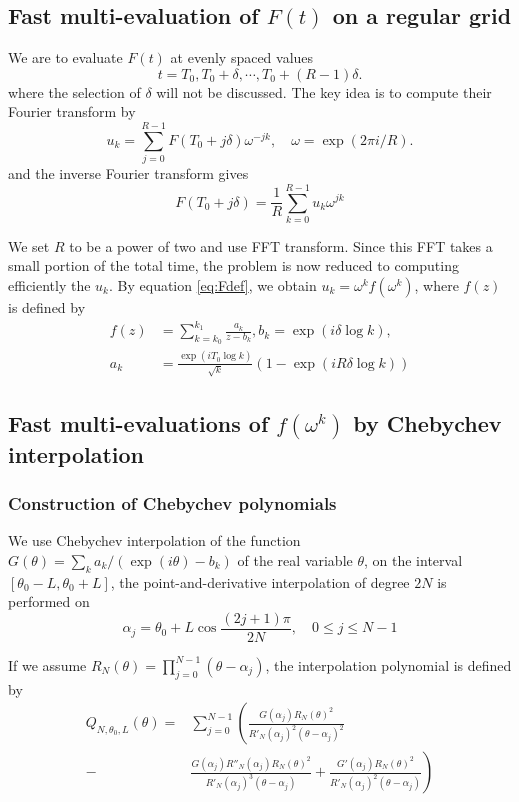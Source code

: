 \documentclass[conference,9pt]{IEEEtran}
\theoremstyle{definition}
\begin{document}
\subsection{Fast multi-evaluation of $F(t)$ on a regular grid}
We are to evaluate $F(t)$ at evenly spaced values
\begin{equation*}
    t=T_0,T_0+\delta,\cdots,T_0+(R-1)\delta.
\end{equation*}
where the selection of $\delta$ will not be discussed. The key idea is to compute their Fourier transform by
\begin{equation*}
    u_k=\sum_{j=0}^{R-1}F(T_0+j\delta)\omega^{-jk},\quad \omega=\exp(2\pi i/R).
\end{equation*}
and the inverse Fourier transform gives
\begin{equation*}
    F(T_0+j\delta)=\frac{1}{R}\sum_{k=0}^{R-1}u_k \omega^{jk}
\end{equation*}

We set $R$ to be a power of two and use FFT transform. Since this FFT takes a small portion of the total time, the problem is now reduced to computing efficiently the $u_k$. By equation \ref{eq:Fdef}, we obtain $u_k=\omega^kf(\omega^k)$, where $f(z)$ is defined by
\begin{subequations}
    \begin{align*}
        f(z)&=\sum_{k=k_0}^{k_1}\frac{a_k}{z-b_k},b_k=\exp({i\delta \log k}), \\
        a_k&=\frac{\exp({iT_0\log k})}{\sqrt{k}}\left(
            1-\exp({iR\delta\log k})
        \right)    
    \end{align*}
\end{subequations}

\subsection{Fast multi-evaluations of $f(\omega^k)$ by Chebychev interpolation}
\subsubsection{Construction of Chebychev polynomials}
We use Chebychev interpolation of the function $G(\theta)=\sum_k a_k/(\exp(i\theta)-b_k)$ of the real variable $\theta$, on the interval $[\theta_0-L,\theta_0+L]$, the point-and-derivative interpolation of degree $2N$ is performed on
$$
    \alpha_j=\theta_0+L\cos\frac{(2j+1)\pi}{2N},\quad 0\leq j\leq N-1
$$

If we assume $R_N(\theta)=\prod_{j=0}^{N-1}(\theta-\alpha_j)$, the interpolation polynomial is defined by
\begin{equation*}
\begin{split}
    Q_{N,\theta_0,L}(\theta)=&\sum\limits_{j=0}^{N-1}
        \left(
        \frac{G(\alpha_j)R_N(\theta)^2}{R'_N(\alpha_j)^2(\theta-\alpha_j)^2}\right. \\
        -&\left.\frac{G(\alpha_j)R''_N(\alpha_j)R_N(\theta)^2}{R'_N(\alpha_j)^3(\theta-\alpha_j)}+
            \frac{G'(\alpha_j)R_N(\theta)^2}{R'_N(\alpha_j)^2(\theta-\alpha_j)}
        \right)
\end{split}
\end{equation*}
\end{document}
